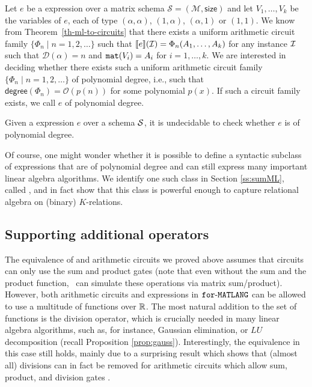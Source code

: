 Let $e$ be a \langfor expression over a matrix schema $\mathcal{S}=(\mathcal{M},\textsf{size})$ and let $V_1,\ldots, V_k$ be
the variables of $e$, each of type $(\alpha,\alpha)$, $(1,\alpha)$, $(\alpha,1)$ or $(1,1)$. We know from Theorem~\ref{th-ml-to-circuits}
that there exists a uniform arithmetic circuit family $\{\Phi_n \mid n=1,2,\ldots\}$
such that $\llbracket e \rrbracket(\mathcal{I})=\Phi_n(A_1,\ldots,A_k)$ for any instance $\mathcal{I}$ such that
$\mathcal{D}(\alpha)=n$ and $\texttt{mat}(V_i)=A_i$ for $i=1,\ldots,k$. We are interested in deciding
whether there exists such a  uniform arithmetic circuit family $\{\Phi_n \mid n=1,2,\ldots\}$
of polynomial degree, i.e., such that $\mathsf{degree}(\Phi_n)=\mathcal{O}(p(n))$ for some polynomial $p(x)$. If such a circuit family exists, we call $e$ of polynomial degree.

\begin{proposition}
\label{prop-undec}
Given a \langfor expression $e$ over a schema $\mathcal{S}$, it is undecidable to check whether $e$ is of polynomial degree.
\end{proposition}


Of course, one might wonder whether it is possible to define a syntactic subclass of \langfor expressions that are of polynomial degree and can still express many important linear algebra algorithms. We identify one such class in Section \ref{ss:sumML}, called \langsum, and in fact show that this class is powerful enough to capture relational algebra on (binary) $K$-relations. 
\subsection{Supporting additional operators}\label{subsec:additionalop}
The equivalence of \langfor and arithmetic circuits we proved above assumes that circuits can only use the sum and product gates (note that even without the sum and the product function, \langfor\ can simulate these operations via matrix sum/product). However, both arithmetic circuits and expressions in $\texttt{for}\text{-}\texttt{MATLANG}$ can be allowed to use a multitude of functions over $\mathbb{R}$. The most natural addition to the set of functions is the division operator, which is crucially needed in many linear algebra algorithms, such as, for instance, Gaussian elimination, or $LU$ decomposition (recall Proposition \ref{prop:gauss}).
Interestingly, the equivalence in this case still holds, mainly due to a surprising result which shows that (almost all) divisions can in fact be removed for arithmetic circuits which allow sum, product, and division gates \cite{allender}.

